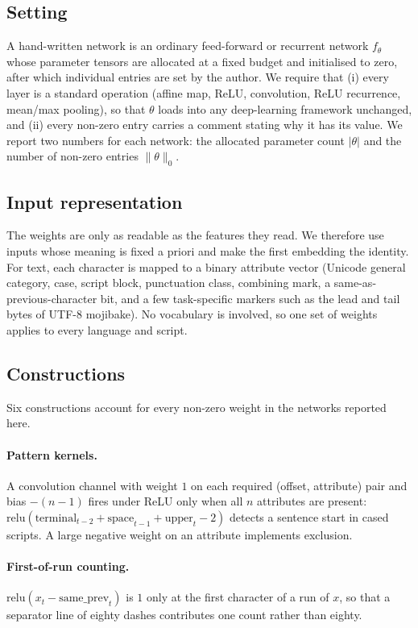 \subsection{Setting}
A hand-written network is an ordinary feed-forward or recurrent network
$f_\theta$ whose parameter tensors are allocated at a fixed budget and
initialised to zero, after which individual entries are set by the author.
We require that (i) every layer is a standard operation (affine map, ReLU,
convolution, ReLU recurrence, mean/max pooling), so that $\theta$ loads into
any deep-learning framework unchanged, and (ii) every non-zero entry carries a
comment stating why it has its value. We report two numbers for each network:
the allocated parameter count $|\theta|$ and the number of non-zero entries
$\|\theta\|_0$.

\subsection{Input representation}
The weights are only as readable as the features they read. We therefore use
inputs whose meaning is fixed a priori and make the first embedding the
identity. For text, each character is mapped to a binary attribute vector
(Unicode general category, case, script block, punctuation class, combining
mark, a same-as-previous-character bit, and a few task-specific markers such
as the lead and tail bytes of UTF-8 mojibake). No vocabulary is involved, so
one set of weights applies to every language and script.

\subsection{Constructions}
Six constructions account for every non-zero weight in the networks reported
here.

\paragraph{Pattern kernels.} A convolution channel with weight $1$ on each
required (offset, attribute) pair and bias $-(n-1)$ fires under ReLU only when
all $n$ attributes are present: $\mathrm{relu}(\text{terminal}_{t-2} +
\text{space}_{t-1} + \text{upper}_t - 2)$ detects a sentence start in cased
scripts. A large negative weight on an attribute implements exclusion.

\paragraph{First-of-run counting.} $\mathrm{relu}(x_t - \text{same\_prev}_t)$
is $1$ only at the first character of a run of $x$, so that a separator line
of eighty dashes contributes one count rather than eighty.

